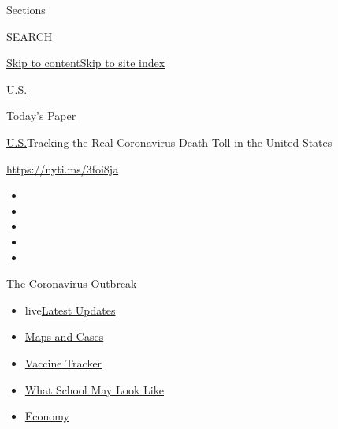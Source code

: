 Sections

SEARCH

\protect\hyperlink{site-content}{Skip to
content}\protect\hyperlink{site-index}{Skip to site index}

\href{https://www.nytimes.com/section/us}{U.S.}

\href{https://myaccount.nytimes.com/auth/login?response_type=cookie\&client_id=vi}{}

\href{https://www.nytimes.com/section/todayspaper}{Today's Paper}

\href{/section/us}{U.S.}\textbar{}Tracking the Real Coronavirus Death
Toll in the United States

\url{https://nyti.ms/3foi8ja}

\begin{itemize}
\item
\item
\item
\item
\item
\end{itemize}

\href{https://www.nytimes.com/news-event/coronavirus?action=click\&pgtype=Article\&state=default\&region=TOP_BANNER\&context=storylines_menu}{The
Coronavirus Outbreak}

\begin{itemize}
\tightlist
\item
  live\href{https://www.nytimes.com/2020/08/01/world/coronavirus-covid-19.html?action=click\&pgtype=Article\&state=default\&region=TOP_BANNER\&context=storylines_menu}{Latest
  Updates}
\item
  \href{https://www.nytimes.com/interactive/2020/us/coronavirus-us-cases.html?action=click\&pgtype=Article\&state=default\&region=TOP_BANNER\&context=storylines_menu}{Maps
  and Cases}
\item
  \href{https://www.nytimes.com/interactive/2020/science/coronavirus-vaccine-tracker.html?action=click\&pgtype=Article\&state=default\&region=TOP_BANNER\&context=storylines_menu}{Vaccine
  Tracker}
\item
  \href{https://www.nytimes.com/interactive/2020/07/29/us/schools-reopening-coronavirus.html?action=click\&pgtype=Article\&state=default\&region=TOP_BANNER\&context=storylines_menu}{What
  School May Look Like}
\item
  \href{https://www.nytimes.com/live/2020/07/31/business/stock-market-today-coronavirus?action=click\&pgtype=Article\&state=default\&region=TOP_BANNER\&context=storylines_menu}{Economy}
\end{itemize}

